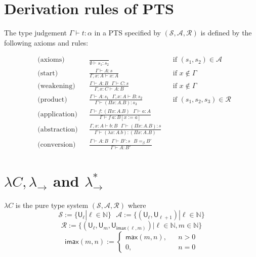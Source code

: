 \appendix
\section{Derivation rules of PTS}\label{apppts}

  The type judgement $\Gamma \vdash t : \alpha$ in a PTS specified
  by $(\mathcal{S}, \mathcal{A}, \mathcal{R})$ is defined by the following
  axioms and rules:

  $$\begin{aligned}
    & \text{(axioms)}      & & \frac{}{\emptyset \vdash s_1 : s_2} & & \text{if } (s_1, s_2) \in \mathcal{A} \\
    & \text{(start)}       & & \frac{\Gamma \vdash A : s}{\Gamma, x : A \vdash x : A} & & \text{if } x \notin \Gamma \\
    & \text{(weakening)}   & & \frac{\Gamma \vdash A : B \ \ \ \Gamma \vdash C : s}{\Gamma, x : C \vdash A : B} & & \text{if } x \notin \Gamma \\
    & \text{(product)}     & & \frac{\Gamma \vdash A : s_1 \ \ \ \Gamma, x : A \vdash B : s_2}{\Gamma \vdash (\Pi x : A. B) : s_3} & & \text{if } (s_1, s_2, s_3) \in \mathcal{R} \\
    & \text{(application)} & & \frac{\Gamma \vdash f : (\Pi x : A. B) \ \ \ \Gamma \vdash a : A}{\Gamma \vdash f \ a : B[x := a]} & & \\
    & \text{(abstraction)} & & \frac{\Gamma, x : A \vdash b : B \ \ \ \Gamma \vdash (\Pi x : A. B) : s}{\Gamma \vdash (\lambda x : A.b) : (\Pi x : A. B)} & & \\
    & \text{(conversion)}  & & \frac{\Gamma \vdash A : B \ \ \ \Gamma \vdash B' : s \ \ \ B =_\beta B'}{\Gamma \vdash A : B'} & &
  \end{aligned}$$

\section{$\lambda C, \lambda_\to$ and $\lambda_\to^*$}\label{applll}

  \begin{definition} $\lambda C$ is the pure type system $(\mathcal{S}, \mathcal{A}, \mathcal{R})$ where
    $$\mathcal{S} := \{\mathsf{U}_\ell | \ell \in \mathbb{N}\} \ \ \ \mathcal{A} := \{(\mathsf{U}_\ell, \mathsf{U}_{\ell + 1}) | \ell \in \mathbb{N}\}$$
    $$\mathcal{R} := \{(\mathsf{U}_\ell, \mathsf{U}_m, \mathsf{U}_{\mathsf{imax}(\ell, m)}) | \ell \in \mathbb{N}, m \in \mathbb{N}\}$$
    $$\mathsf{imax}(m, n) := \left\{\begin{aligned}
      \mathsf{max}(m, n), & & n > 0 \\
      0, & & n = 0
    \end{aligned}\right.$$
  \end{definition}
  
